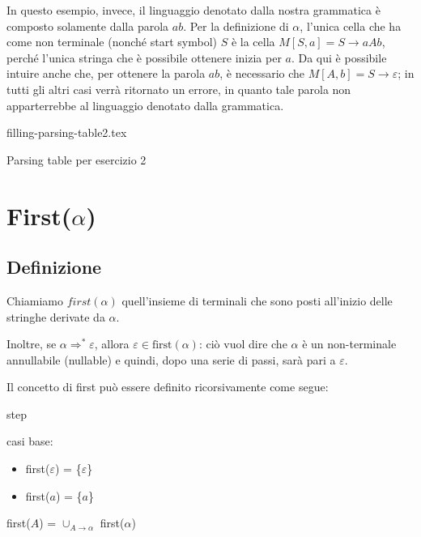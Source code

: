 \documentclass[class=book, crop=false, oneside, 12pt]{standalone}
\begin{document}
In questo esempio, invece, il linguaggio denotato dalla nostra grammatica è composto solamente dalla parola \(ab\). Per la definizione di \(\alpha\), l'unica cella che ha come non terminale (nonché start symbol) \(S\) è la cella \(M[S, a] = S \rightarrow aAb\), perché l'unica stringa che è possibile ottenere inizia per \(a\). Da qui è possibile intuire anche che, per ottenere la parola \(ab\), è necessario che \(M[A, b] = S \rightarrow \varepsilon\); in tutti gli altri casi verrà ritornato un errore, in quanto tale parola non apparterrebbe al linguaggio denotato dalla grammatica. 

\begin{table}[H]
	\centering
	{filling-parsing-table2.tex}
    \caption{Parsing table per esercizio 2}
    \label{filling-parsing-table2}
\end{table}

\section{First(\(\alpha\))}
\subsection{Definizione}
\begin{definition}
    Chiamiamo \(first(\alpha)\) quell'insieme di terminali che sono posti all'inizio delle stringhe derivate da \(\alpha\).
    
    Inoltre, se \(\alpha \Rightarrow^* \varepsilon\), allora \(\varepsilon \in \textrm{first}(\alpha)\): ciò vuol dire che \(\alpha\) è un non-terminale annullabile (nullable) e quindi, dopo una serie di passi, sarà pari a \(\varepsilon\).
\end{definition}

Il concetto di first può essere definito ricorsivamente come segue:

\begin{labeling}{step}
    \item[base] casi base:
    \begin{itemize}
        \item first(\(\varepsilon\)) = \{\(\varepsilon\)\}
        \item first(\(a\)) = \{\(a\)\}
    \end{itemize}
    \item[step] first(\(A\)) = \(\cup_{A \rightarrow \alpha}\) first(\(\alpha\))
\end{labeling}
\end{document}
